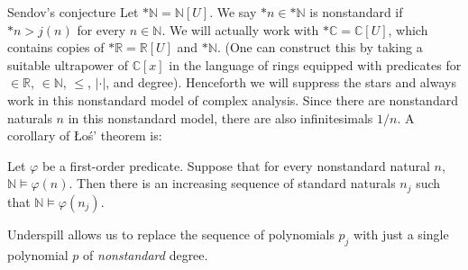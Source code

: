 \documentclass[10pt]{beamer}
\newcommand{\NN}{\mathbb{N}}
\newcommand{\RR}{\mathbb{R}}
\newcommand{\CC}{\mathbb{C}}
\begin{document}
\begin{frame}{Sendov's conjecture}
    Let $*\NN = \NN[U]$. We say $*n \in *\NN$ is nonstandard if $*n > j(n)$ for every $n \in \NN$.
    We will actually work with $*\CC = \CC[U]$, which contains copies of $*\RR = \RR[U]$ and $*\NN$.
    (One can construct this by taking a suitable ultrapower of $\CC[x]$ in the language of rings equipped with predicates for $\in \RR$, $\in \NN$, $\leq$, $|\cdot|$, and degree). \pause
    Henceforth we will suppress the stars and always work in this nonstandard model of complex analysis.
    Since there are nonstandard naturals $n$ in this nonstandard model, there are also infinitesimals $1/n$. \pause
    A corollary of Łoś' theorem is:
\begin{theorem}[underspill]
    Let $\varphi$ be a first-order predicate. Suppose that for every nonstandard natural $n$, $\NN \models \varphi(n)$. Then there is an increasing sequence of standard naturals $n_j$ such that $\NN \models \varphi(n_j)$.
\end{theorem}
    Underspill allows us to replace the sequence of polynomials $p_j$ with just a single polynomial $p$ of \emph{nonstandard} degree.
\end{frame}
\end{document}
